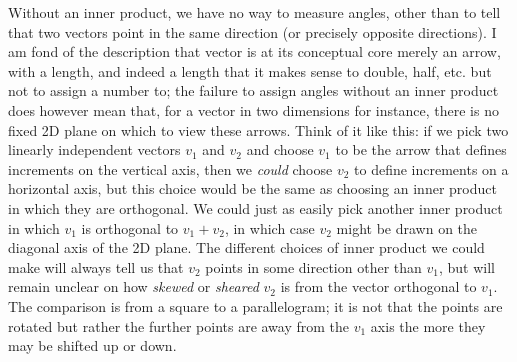 \documentclass[11pt]{article}
\begin{document}
Without an inner product, we have no way to measure angles, other than to tell that two vectors point in the same direction (or precisely opposite directions). I am fond of the description that vector is at its conceptual core merely an arrow, with a length, and indeed a length that it makes sense to double, half, etc. but not to assign a number to; the failure to assign angles without an inner product does however mean that, for a vector in two dimensions for instance, there is no fixed 2D plane on which to view these arrows. Think of it like this: if we pick two linearly independent vectors $v_1$ and $v_2$ and choose $v_1$ to be the arrow that defines increments on the vertical axis, then we \emph{could} choose $v_2$ to define increments on a horizontal axis, but this choice would be the same as choosing an inner product in which they are orthogonal. We could just as easily pick another inner product in which $v_1$ is orthogonal to $v_1 + v_2$, in which case $v_2$ might be drawn on the diagonal axis of the 2D plane. The different choices of inner product we could make will always tell us that $v_2$ points in some direction other than $v_1$, but will remain unclear on how \emph{skewed} or \emph{sheared} $v_2$ is from the vector orthogonal to $v_1$. The comparison is from a square to a parallelogram; it is not that the points are rotated but rather the further points are away from the $v_1$ axis the more they may be shifted up or down.

\end{document}
